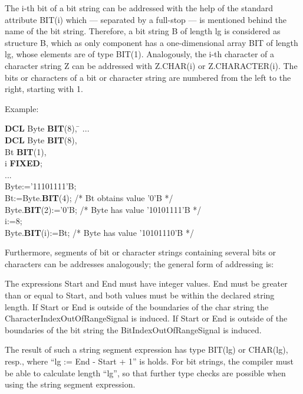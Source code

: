 

The i-th bit of a bit string can be addressed with the help of the
standard attribute BIT(i) which --- separated by a full-stop --- is mentioned
behind the name of the bit string. Therefore, a bit string B of length
lg is considered as structure B, which as only component has a
one-dimensional array BIT of length lg, whose elements are of type
BIT(1). Analogously, the i-th character of a character string Z can be
addressed with Z.CHAR(i) or Z.CHARACTER(i). The bits or characters of a
bit or character string are numbered from the left to the right, starting with 1.

Example:

\begin{tabbing}
{\bf DCL} Byte {\bf BIT}(8), \= \kill
... \> \\
{\bf DCL} Byte {\bf BIT}(8), \> \\
\x Bt {\bf BIT}(1),   \> \\
\x i {\bf FIXED};     \> \\
... \> \\
Byte:='11101111'B;            \> \\
Bt:=Byte.{\bf BIT}(4);        \> /* Bt obtains value '0'B */\\
Byte.{\bf BIT}(2):='0'B;      \> /* Byte has value '10101111'B */\\
i:=8; \> \\
Byte.{\bf BIT}(i):=Bt;        \> /* Byte has value '10101110'B */
\end{tabbing}

Furthermore, segments of bit or character strings containing several
bits or characters can be addresses analogously; the general form of
addressing is:




The expressions Start and End must have integer values. End must be
greater than or equal to Start, and both values must be within the
declared string length.
If Start or End is outside of the boundaries of  the char string
the CharacterIndexOutOfRangeSignal is induced.
If Start or End is outside of the boundaries of  the bit string
the BitIndexOutOfRangeSignal is induced.

The result of such a string segment expression has type BIT(lg) or
CHAR(lg), resp., where ``lg := End - Start + 1'' is holds. For bit
strings, the compiler must be able to calculate length ``lg'', so that
further type checks are possible when using the string segment
expression.

